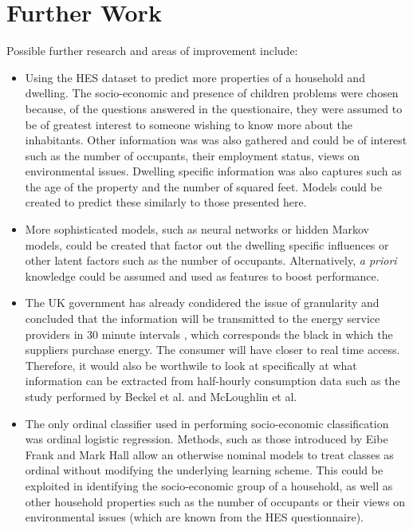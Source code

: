 \section{Further Work}
Possible further research and areas of improvement include:
\begin{itemize}
\item Using the HES dataset to predict more properties of a household and dwelling. The socio-economic and presence of children problems were chosen because, of the questions answered in the questionaire, they were assumed to be of greatest interest to someone wishing to know more about the inhabitants. Other information was was also gathered and could be of interest such as the number of occupants, their employment status, views on environmental issues. Dwelling specific information was also captures such as the age of the property and the number of squared feet. Models could be created to predict these similarly to those presented here.
\item More sophisticated models, such as neural networks or hidden Markov models, could be created that factor out the dwelling specific influences or other latent factors such as the number of occupants. Alternatively, \textit{a priori} knowledge could be assumed and used as features to boost performance.
\item The UK government has already condidered the issue of granularity and concluded that the information will be transmitted to the energy service providers in 30 minute intervals \cite{DECC_1}, which corresponds the black in which the suppliers purchase energy. The consumer will have closer to real time access. Therefore, it would also be worthwile to look at specifically at what information can be extracted from half-hourly consumption data such as the study performed by Beckel et al. and McLoughlin et al.\cite{Beckel_2, McLoughlin}
\item The only ordinal classifier used in performing socio-economic classification was ordinal logistic regression. Methods, such as those introduced by Eibe Frank and Mark Hall \cite{Frank} allow an otherwise nominal models to treat classes as ordinal without modifying the underlying learning scheme. This could be exploited in identifying the socio-economic group of a household, as well as other household properties such as the number of occupants or their views on environmental issues (which are known from the HES questionnaire).
\end{itemize}
